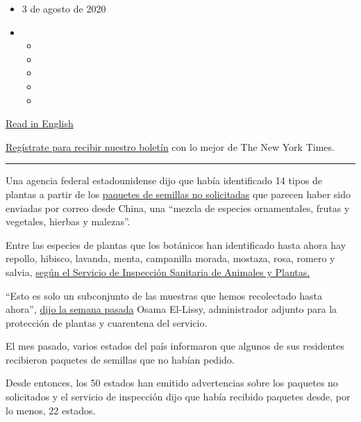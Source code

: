 \begin{itemize}
\item
  3 de agosto de 2020
\item
  \begin{itemize}
  \item
  \item
  \item
  \item
  \item
  \end{itemize}
\end{itemize}

\href{https://www.nytimes3xbfgragh.onion/2020/08/02/us/Seed-packets-China-USA.html}{Read
in English}

\href{https://www.nytimes3xbfgragh.onion/newsletters/el-times}{Regístrate
para recibir nuestro boletín} con lo mejor de The New York Times.

\begin{center}\rule{0.5\linewidth}{\linethickness}\end{center}

Una agencia federal estadounidense dijo que había identificado 14 tipos
de plantas a partir de los
\href{https://www.nytimes3xbfgragh.onion/2020/07/26/us/seeds-from-china-mail.html}{paquetes
de semillas no solicitadas} que parecen haber sido enviadas por correo
desde China, una ``mezcla de especies ornamentales, frutas y vegetales,
hierbas y malezas''.

Entre las especies de plantas que los botánicos han identificado hasta
ahora hay repollo, hibisco, lavanda, menta, campanilla morada, mostaza,
rosa, romero y salvia,
\href{https://www.aphis.usda.gov/publications/plant_health/faq-unsolicited-seeds.pdf}{según
el Servicio de Inspección Sanitaria de Animales y Plantas.}

``Esto es solo un subconjunto de las muestras que hemos recolectado
hasta ahora'',
\href{https://www.usda.gov/media/radio/daily-newsline/2020-07-29/actuality-unsolicited-seeds-are-several-plant-species}{dijo
la semana pasada} Osama El-Lissy, administrador adjunto para la
protección de plantas y cuarentena del servicio.

El mes pasado, varios estados del país informaron que algunos de sus
residentes recibieron paquetes de semillas que no habían pedido.

Desde entonces, los 50 estados han emitido advertencias sobre los
paquetes no solicitados y el servicio de inspección dijo que había
recibido paquetes desde, por lo menos, 22 estados.

